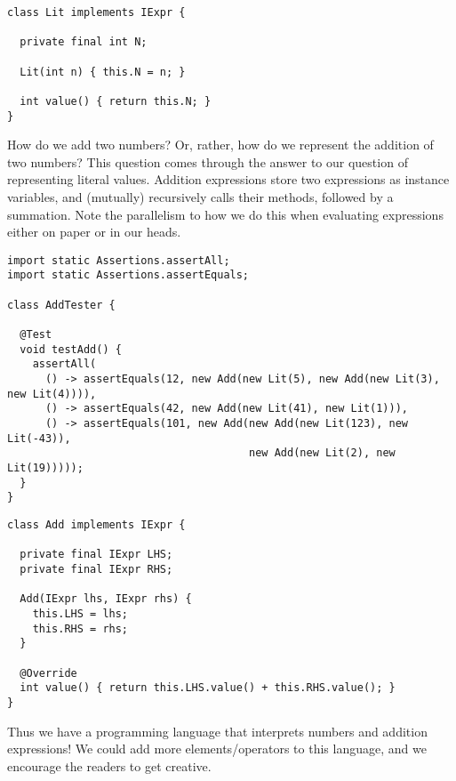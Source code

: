 \begin{lstlisting}[language=MyJava]
class Lit implements IExpr {

  private final int N;

  Lit(int n) { this.N = n; }

  int value() { return this.N; }
}
\end{lstlisting}

How do we add two numbers? Or, rather, how do we represent the addition of two numbers? This question comes through the answer to our question of representing literal values. Addition expressions store two  expressions as instance variables, and (mutually) recursively calls their  methods, followed by a summation. Note the parallelism to how we do this when evaluating expressions either on paper or in our heads.

\begin{lstlisting}[language=MyJava]
import static Assertions.assertAll;
import static Assertions.assertEquals;

class AddTester {

  @Test
  void testAdd() {
    assertAll(
      () -> assertEquals(12, new Add(new Lit(5), new Add(new Lit(3), new Lit(4)))),
      () -> assertEquals(42, new Add(new Lit(41), new Lit(1))),
      () -> assertEquals(101, new Add(new Add(new Lit(123), new Lit(-43)),
                                      new Add(new Lit(2), new Lit(19)))));
  }
}
\end{lstlisting}

\begin{lstlisting}[language=MyJava]
class Add implements IExpr {

  private final IExpr LHS;
  private final IExpr RHS;

  Add(IExpr lhs, IExpr rhs) {
    this.LHS = lhs;
    this.RHS = rhs;
  }

  @Override
  int value() { return this.LHS.value() + this.RHS.value(); }
}
\end{lstlisting}

Thus we have a programming language that interprets numbers and addition expressions! We could add more elements/operators to this language, and we encourage the readers to get creative.


